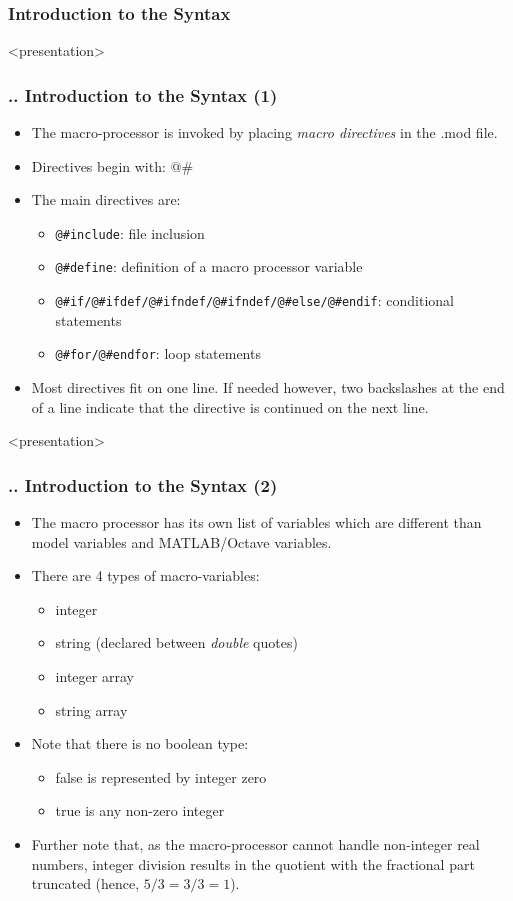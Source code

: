 \documentclass[11pt,aspectratio=169]{beamer}
\begin{document}
\subsubsection{Introduction to the Syntax}
\begin{frame}<presentation>
	\frametitle{{\thesection.\thesubsection.\thesubsubsection} Introduction to the Syntax (1)}
	\begin{itemize}
		\item The macro-processor is invoked by placing \textit{macro directives} in the .mod file. 
		\item Directives begin with: @\#  
		\item The main directives are:
		\begin{itemize}
			\item \texttt{@\#include}: file inclusion
			\item \texttt{@\#define}: definition of a macro processor variable
			\item \texttt{@\#if/@\#ifdef/@\#ifndef/@\#ifndef/@\#else/@\#endif}: conditional statements
			\item \texttt{@\#for/@\#endfor}: loop statements 
		\end{itemize}
	\item Most directives fit on one line. If needed however, two backslashes at the end of a line indicate that the directive is continued on the next line.
	\end{itemize}
\end{frame}
\begin{frame}<presentation>
	\frametitle{{\thesection.\thesubsection.\thesubsubsection} Introduction to the Syntax (2)}
	\begin{itemize}
		\item The macro processor has its own list of variables which are different than model variables and MATLAB/Octave variables.
		\item There are 4 types of macro-variables:
		\begin{itemize}
			\item integer
			\item string (declared between \textit{double} quotes)
			\item integer array
			\item string array
		\end{itemize}
		\item Note that there is no boolean type:
		\begin{itemize}
			\item false is represented by integer zero
			\item true is any non-zero integer
		\end{itemize} 
		\item Further note that, as the macro-processor cannot handle non-integer real numbers, integer division results in the quotient with the fractional part truncated (hence, $5/3=3/3=1$).
	\end{itemize}
\end{frame}
\end{document}
